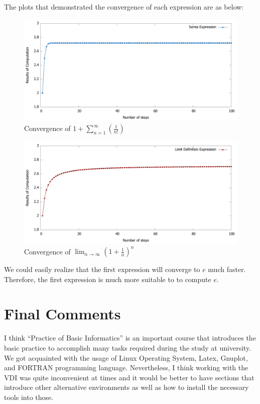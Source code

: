 \documentclass[11pt]{article}
\begin{document}
The plots that demonstrated the convergence of each expression are as below:
\begin{figure}[h]
   \centering
   \includegraphics[scale=0.2]{data1}
   \caption{Convergence of $1+\sum_{n=1}^{\infty}\left(\frac{1}{n !}\right)$}
\end{figure} 
\begin{figure}[h]
   \centering
   \includegraphics[scale=0.2]{data2}
   \caption{Convergence of $\lim _{n \rightarrow \infty}\left(1+\frac{1}{n}\right)^{n}$}
\end{figure} 
We could easily realize that the first expression will converge to $e$ much faster. Therefore, the first expression is much more suitable to to compute $e$.
\newpage
\section{Final Comments}
I think “Practice of Basic Informatics” is an important course that introduces the basic practice to accomplish many tasks required during the study at university. We got acquainted with the usage of Linux Operating System, Latex, Gnuplot, and FORTRAN programming language. Nevertheless, I think working with the VDI was quite inconvenient at times and it would be better to have sections that introduce other alternative environments as well as how to install the necessary tools into those.  
\end{document}
